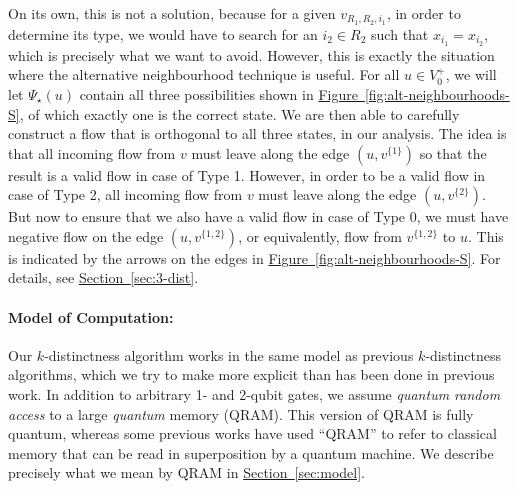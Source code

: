 \documentclass{theoretics}
\renewcommand{\sec}[1]{\hyperref[sec:#1]{Section~\ref*{sec:#1}}}
\newcommand{\fig}[1]{\hyperref[fig:#1]{Figure~\ref*{fig:#1}}}
\renewcommand{\>}{\rangle}
\newcommand{\<}{\langle}
\renewcommand{\(}{\left(}
\renewcommand{\)}{\right)}
\begin{document}

On its own, this is not a solution, because for a given $v_{R_1,R_2,i_1}$, in order to determine its type, we would have to search for an $i_2\in R_2$ such that $x_{i_1}=x_{i_2}$, which is precisely what we want to avoid. However, this is exactly the situation where the alternative neighbourhood technique is useful. For all $u\in V_0^+$, we will let $\Psi_\star(u)$ contain all three possibilities shown in \fig{alt-neighbourhoods-S}, of which exactly one is the correct state. We are then able to carefully construct a flow that is orthogonal to all three states, in our analysis. The idea is that all incoming flow from $v$ must leave along the edge $(u,v^{\{1\}})$ so that the result is a valid flow in case of Type 1. However, in order to be a valid flow in case of Type 2, all incoming flow from $v$ must leave along the edge $(u,v^{\{2\}})$. But now to ensure that we also have a valid flow in case of Type 0, we must have negative flow on the edge $(u,v^{\{1,2\}})$, or equivalently, flow from $v^{\{1,2\}}$ to $u$. This is indicated by the arrows on the edges in \fig{alt-neighbourhoods-S}. For details, see \sec{3-dist}. 

\paragraph{Model of Computation:} Our $k$-distinctness algorithm works in the same model as previous $k$-distinctness algorithms, which we try to make more explicit than has been done in previous work. In addition to arbitrary 1- and 2-qubit gates, we assume \emph{quantum random access} to a large \emph{quantum} memory (QRAM). This version of QRAM is fully quantum, whereas some previous works have used ``QRAM'' to refer to classical memory that can be read in superposition by a quantum machine.  We describe precisely what we mean by QRAM in \sec{model}.
\end{document}
